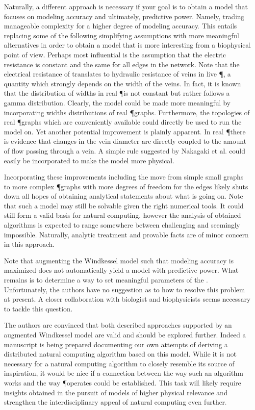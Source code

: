 	Naturally, a different approach is necessary if your goal is to obtain a model that focuses on modeling accuracy and ultimately, predictive power. Namely, trading manageable complexity for a higher degree of modeling accuracy. This entails replacing some of the following simplifying assumptions with more meaningful alternatives in order to obtain a model that is more interesting from a biophysical point of view. Perhaps most influential is the assumption that the electric resistance is constant and the same for all edges in the network. Note that the electrical resistance of \Pes translates to hydraulic resistance of veins in live \P, a quantity which strongly depends on the width of the veins. In fact, it is known that the distribution of widths in real \P is not constant but rather follows a gamma distribution. Clearly, the model could be made more meaningful by incorporating widths distributions of real \P graphs. Furthermore, the topologies of real \P graphs which are conveniently available could directly be used to run the model on. Yet another potential improvement is plainly apparent. In real \P there is evidence that changes in the vein diameter are directly coupled to the amount of flow passing through a vein. A simple rule suggested by Nakagaki et al. could easily be incorporated to make the model more physical.

	Incorporating these improvements including the move from simple small graphs to more complex \P graphs with more degrees of freedom for the edges likely shuts down all hopes of obtaining analytical statements about what is going on. Note that such a model may still be solvable given the right numerical tools. It could still form a valid basis for natural computing, however the analysis of obtained algorithms is expected to range somewhere between challenging and seemingly impossible. Naturally, analytic treatment and provable facts are of minor concern in this approach.

	Note that augmenting the Windkessel model such that modeling accuracy is maximized does not automatically yield a model with predictive power. What remains is to determine a way to set meaningful parameters of the \Pes. Unfortunately, the authors have no suggestion as to how to resolve this problem at present. A closer collaboration with biologist and biophysicists seems necessary to tackle this question.

	The authors are convinced that both described approaches supported by an augmented Windkessel model are valid and should be explored further. Indeed a manuscript is being prepared documenting our own attempts of deriving a distributed natural computing algorithm based on this model. While it is not necessary for a natural computing algorithm to closely resemble its source of inspiration, it would be nice if a connection between the way such an algorithm works and the way \P operates could be established. This task will likely require insights obtained in the pursuit of models of higher physical relevance and strengthen the interdisciplinary appeal of natural computing even further.
